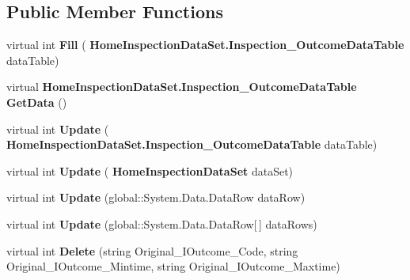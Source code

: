 \subsection*{Public Member Functions}
\begin{DoxyCompactItemize}
\item 
\mbox{\label{class_a_f_h___scheduler_1_1_home_inspection_data_set_table_adapters_1_1_inspection___outcome_table_adapter_a1899d73da3bbd3a3c24be688e1213cca}} 
virtual int {\bfseries Fill} (\textbf{ Home\+Inspection\+Data\+Set.\+Inspection\+\_\+\+Outcome\+Data\+Table} data\+Table)
\item 
\mbox{\label{class_a_f_h___scheduler_1_1_home_inspection_data_set_table_adapters_1_1_inspection___outcome_table_adapter_a2d16e9305224cb45441d994f2d92dec2}} 
virtual \textbf{ Home\+Inspection\+Data\+Set.\+Inspection\+\_\+\+Outcome\+Data\+Table} {\bfseries Get\+Data} ()
\item 
\mbox{\label{class_a_f_h___scheduler_1_1_home_inspection_data_set_table_adapters_1_1_inspection___outcome_table_adapter_a063160507f3d4beed87cd042dd715bd4}} 
virtual int {\bfseries Update} (\textbf{ Home\+Inspection\+Data\+Set.\+Inspection\+\_\+\+Outcome\+Data\+Table} data\+Table)
\item 
\mbox{\label{class_a_f_h___scheduler_1_1_home_inspection_data_set_table_adapters_1_1_inspection___outcome_table_adapter_a19bdff5947cfb222987a14c0b0279441}} 
virtual int {\bfseries Update} (\textbf{ Home\+Inspection\+Data\+Set} data\+Set)
\item 
\mbox{\label{class_a_f_h___scheduler_1_1_home_inspection_data_set_table_adapters_1_1_inspection___outcome_table_adapter_a331ed6dd9b33848af00d8106810a5a80}} 
virtual int {\bfseries Update} (global\+::\+System.\+Data.\+Data\+Row data\+Row)
\item 
\mbox{\label{class_a_f_h___scheduler_1_1_home_inspection_data_set_table_adapters_1_1_inspection___outcome_table_adapter_aef4f5b3ad0d0535b390d5a590d56ccce}} 
virtual int {\bfseries Update} (global\+::\+System.\+Data.\+Data\+Row[$\,$] data\+Rows)
\item 
\mbox{\label{class_a_f_h___scheduler_1_1_home_inspection_data_set_table_adapters_1_1_inspection___outcome_table_adapter_ac4e71c6fd342cd7ecdac8e1888477cb9}} 
virtual int {\bfseries Delete} (string Original\+\_\+\+I\+Outcome\+\_\+\+Code, string Original\+\_\+\+I\+Outcome\+\_\+\+Mintime, string Original\+\_\+\+I\+Outcome\+\_\+\+Maxtime)
\item 
\mbox{\label{class_a_f_h___scheduler_1_1_home_inspection_data_set_table_adapters_1_1_inspection___outcome_table_adapter_ae638e94c60f17df0b0663c55766106de}} 

\end{DoxyCompactItemize}
